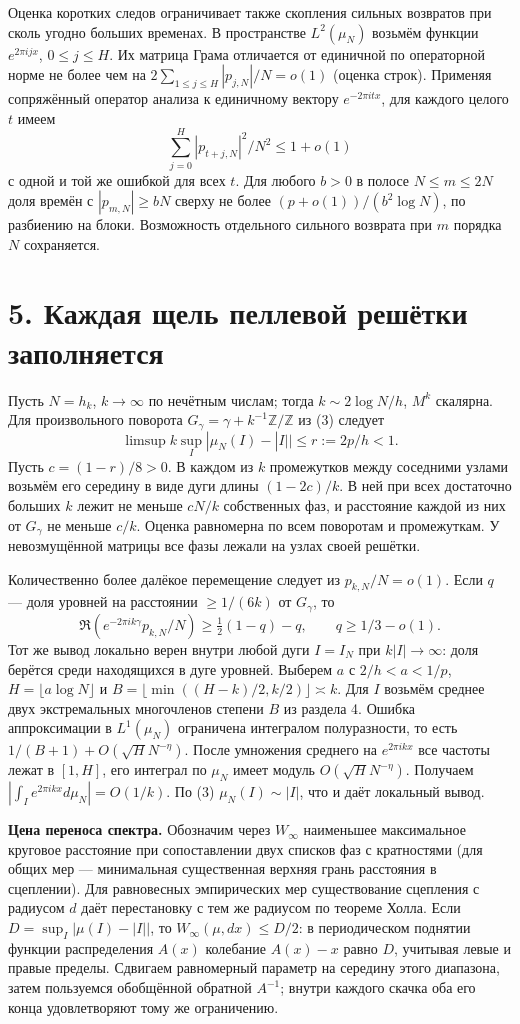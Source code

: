 \documentclass[11pt,a4paper]{article}
\newcommand{\Z}{\mathbb Z}
\newcommand{\sect}[1]{\section*{\sffamily\color{ink}#1}}
\newcommand{\subt}[1]{\par\medskip\noindent\textbf{#1.}\quad}
\begin{document}
Оценка коротких следов ограничивает также скопления сильных возвратов при сколь угодно больших временах. В пространстве $L^2(\mu_N)$ возьмём функции $e^{2\pi ijx}$, $0\le j\le H$. Их матрица Грама отличается от единичной по операторной норме не более чем на $2\sum_{1\le j\le H}|p_{j,N}|/N=o(1)$ (оценка строк). Применяя сопряжённый оператор анализа к единичному вектору $e^{-2\pi itx}$, для каждого целого $t$ имеем
\[
           \sum_{j=0}^{H}|p_{t+j,N}|^2/N^2\le1+o(1)                     \tag{4}
\]
с одной и той же ошибкой для всех $t$. Для любого $b>0$ в полосе $N\le m\le2N$ доля времён с $|p_{m,N}|\ge bN$ сверху не более $(p+o(1))/(b^2\log N)$, по разбиению на блоки. Возможность отдельного сильного возврата при $m$ порядка $N$ сохраняется.
\newpage
\sect{5. Каждая щель пеллевой решётки заполняется}
Пусть $N=h_k$, $k\to\infty$ по нечётным числам; тогда $k\sim2\log N/h$, $M^k$ скалярна. Для произвольного поворота $G_\gamma=\gamma+k^{-1}\Z/\Z$ из (3) следует
\[
 \limsup k\sup_I|\mu_N(I)-|I||\le r:=2p/h<1.
\]
Пусть $c=(1-r)/8>0$. В каждом из $k$ промежутков между соседними узлами возьмём его середину в виде дуги длины $(1-2c)/k$. В ней при всех достаточно больших $k$ лежит не меньше $cN/k$ собственных фаз, и расстояние каждой из них от $G_\gamma$ не меньше $c/k$. Оценка равномерна по всем поворотам и промежуткам. У невозмущённой матрицы все фазы лежали на узлах своей решётки.

Количественно более далёкое перемещение следует из $p_{k,N}/N=o(1)$. Если $q$ --- доля уровней на расстоянии $\ge1/(6k)$ от $G_\gamma$, то
\[
 \Re(e^{-2\pi ik\gamma}p_{k,N}/N)\ge\tfrac12(1-q)-q,
 \qquad q\ge1/3-o(1).
\]
Тот же вывод локально верен внутри любой дуги $I=I_N$ при $k|I|\to\infty$: доля берётся среди находящихся в дуге уровней. Выберем $a$ с $2/h<a<1/p$, $H=\lfloor a\log N\rfloor$ и $B=\lfloor\min((H-k)/2,k/2)\rfloor\asymp k$. Для $I$ возьмём среднее двух экстремальных многочленов степени $B$ из раздела 4. Ошибка аппроксимации в $L^1(\mu_N)$ ограничена интегралом полуразности, то есть $1/(B+1)+O(\sqrt H N^{-\eta})$. После умножения среднего на $e^{2\pi ikx}$ все частоты лежат в $[1,H]$, его интеграл по $\mu_N$ имеет модуль $O(\sqrt H N^{-\eta})$. Получаем $|\int_I e^{2\pi ikx}d\mu_N|=O(1/k)$. По (3) $\mu_N(I)\sim|I|$, что и даёт локальный вывод.

\subt{Цена переноса спектра} Обозначим через $W_\infty$ наименьшее максимальное круговое расстояние при сопоставлении двух списков фаз с кратностями (для общих мер --- минимальная существенная верхняя грань расстояния в сцеплении). Для равновесных эмпирических мер существование сцепления с радиусом $d$ даёт перестановку с тем же радиусом по теореме Холла. Если $D=\sup_I|\mu(I)-|I||$, то $W_\infty(\mu,dx)\le D/2$: в периодическом поднятии функции распределения $A(x)$ колебание $A(x)-x$ равно $D$, учитывая левые и правые пределы. Сдвигаем равномерный параметр на середину этого диапазона, затем пользуемся обобщённой обратной $A^{-1}$; внутри каждого скачка оба его конца удовлетворяют тому же ограничению.
\end{document}
